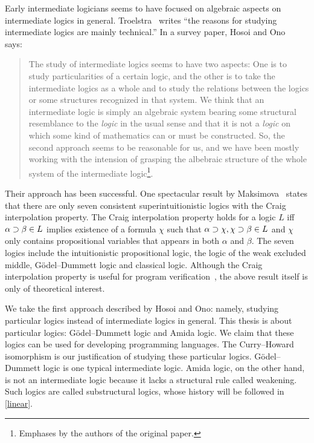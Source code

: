 Early intermediate logicians seems to have focused on algebraic aspects
on intermediate logics in general.
Troelstra~\cite[p.~223]{goedelcollected} writes ``the reasons
for studying intermediate logics are mainly technical.''
In a survey paper, Hosoi and Ono~\cite{hosoi-ono} says:
 \begin{quote}
  The study of intermediate logics seems to have two aspects: One is to
  study particularities of a certain logic, and the other is to take the
  intermediate logics as a whole and to study the relations between the
  logics or some structures recognized in that system.  We think that an
  intermediate logic is simply an algebraic system bearing some
  structural resemblance to the \textit{logic} in the usual sense and
  that it is not a \textit{logic} on which some kind of mathematics can
  or must be constructed.  So, the second approach seems to be
  reasonable for us, and we have been mostly working with the intension
  of grasping the albebraic structure of the whole system of the
  intermediate logic\footnote{Emphases by the authors of the original
  paper.}.
 \end{quote}
Their approach has been successful.
One spectacular result by Maksimova~\citep{maksimova77}
states that there are only seven consistent
superintuitionistic logics with the Craig interpolation
property.
The Craig interpolation property holds for a logic $L$ iff $\alpha
\supset\beta\in L$ implies existence of a formula $\chi$ such that
$\alpha\supset\chi, \chi\supset\beta\in L$ and $\chi$ only contains propositional
variables that appears in both $\alpha$ and $\beta$.
The seven logics include the intuitionistic propositional logic, the logic of
the weak excluded middle,
G\"odel--Dummett logic
and classical logic.
Although the Craig interpolation property is useful for program
verification~\citep{mcmillan2003,esparza,unno2009},
the above result itself is only of
theoretical interest.

We take the first approach described by Hosoi and Ono: namely,
studying particular logics instead of intermediate logics in general.
This thesis is about particular logics: G\"odel--Dummett logic and
Amida logic.  We claim that these logics can be used for developing
 programming languages.  The Curry--Howard
isomorphism is our justification of studying these particular logics.
G\"odel--Dummett logic is one typical intermediate logic.
Amida logic, on the other hand, is not an intermediate logic
because it lacks a structural rule called weakening.  Such logics are
called substructural logics, whose history will be followed in \ref{linear}.

